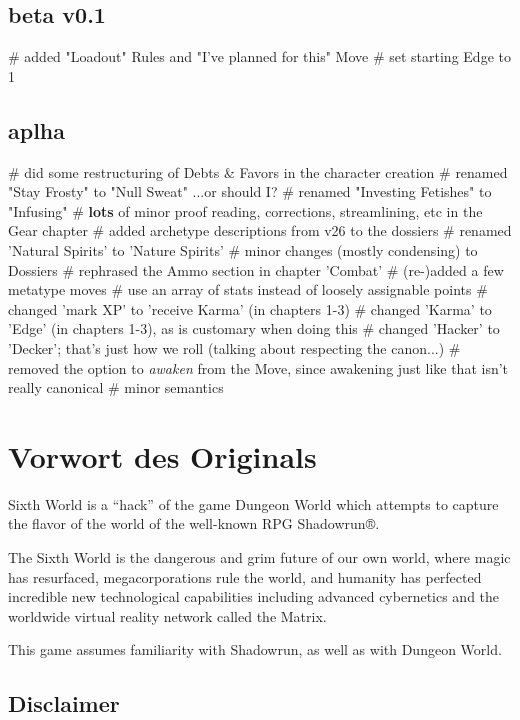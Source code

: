 \subsection*{beta v0.1}
\begin{easylist}
    # added "Loadout" Rules and "I've planned for this" Move
    # set starting Edge to 1
\end{easylist}

\subsection*{aplha}
\begin{easylist}
# did some restructuring of Debts \& Favors in the character creation
# renamed "Stay Frosty" to "Null Sweat" ...or should I?
# renamed "Investing Fetishes" to "Infusing"
# \textbf{lots} of minor proof reading, corrections, streamlining, etc in the Gear chapter
# added archetype descriptions from v26 to the dossiers
# renamed 'Natural Spirits' to 'Nature Spirits'
# minor changes (mostly condensing) to Dossiers
# rephrased the Ammo section in chapter 'Combat'
# (re-)added a few metatype moves
# use an array of stats instead of loosely assignable points
# changed 'mark XP' to 'receive Karma' (in chapters 1-3)
# changed 'Karma' to 'Edge' (in chapters 1-3), as is customary when doing this
# changed 'Hacker' to 'Decker'; that's just how we roll (talking about respecting the canon...)
# removed the option to \textit{awaken} from the  Move, since awakening just like that isn't really canonical
# minor semantics
\end{easylist}


\section{Vorwort des Originals}

Sixth World is a ``hack'' of the game Dungeon World which attempts to capture the flavor of the world of the well-known RPG Shadowrun®.

The Sixth World is the dangerous and grim future of our own world, where magic has resurfaced, megacorporations rule the world, and humanity has perfected incredible new technological capabilities including advanced cybernetics and the worldwide virtual reality network called the Matrix.

This game assumes familiarity with Shadowrun, as well as with Dungeon World.

\subsection{Disclaimer}

